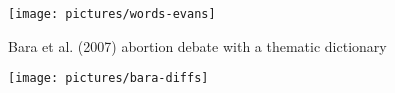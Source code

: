 \documentclass{mediumfoils}
\begin{document}
\centerline{\texttt{[image: pictures/words-evans]}}
%
%
%
%
%
%
%
%
%
%
%
%
%
%


Bara et al. (2007) abortion debate with a thematic dictionary
\begin{center}
\texttt{[image: pictures/bara-diffs]}
\end{center}

\end{document}
